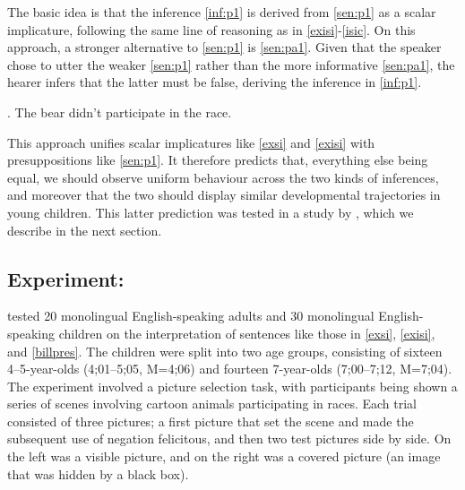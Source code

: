\documentclass[12pt, letterpaper]{article}
\begin{document}
The basic idea is that the inference \ref{inf:p1} is derived from \ref{sen:p1} as a scalar implicature, following the same line of reasoning as in \ref{exisi}-\ref{isic}. On this approach, a stronger alternative to \ref{sen:p1} is \ref{sen:pa1}. Given that the speaker chose to utter the weaker \ref{sen:p1} rather than the more informative \ref{sen:pa1}, the hearer infers that the latter must be false, deriving the inference in \ref{inf:p1}.


\ex. \label{sen:pa1} The bear didn't participate in the race. 

This approach unifies scalar implicatures like \ref{exsi} and \ref{exisi} with presuppositions like \ref{sen:p1}. It therefore predicts that, everything else being equal, we should observe uniform behaviour across the two kinds of inferences, and moreover that the two should display similar developmental trajectories in young children. This latter prediction was tested in a study by \cite{Bill:2014b}, which we describe in the next section. 

\subsection{Experiment: \cite*{Bill:2014b}}\label{sec:experiment}

\cite*{Bill:2014b} tested 20 monolingual English-speaking adults and 30 monolingual English-speaking children on the interpretation of sentences like those in \ref{exsi}, \ref{exisi}, and \ref{billpres}. The children were split into two age groups, consisting of sixteen 4--5-year-olds (4;01--5;05, M=4;06) and fourteen 7-year-olds (7;00--7;12, M=7;04). The experiment involved a picture selection task, with participants being shown a series of scenes involving cartoon animals participating in races. Each trial consisted of three pictures; a first picture that set the scene and made the subsequent use of negation felicitous, and then two test pictures side by side. On the left was a visible picture, and on the right was a covered picture (an image that was hidden by a black box).
\end{document}
